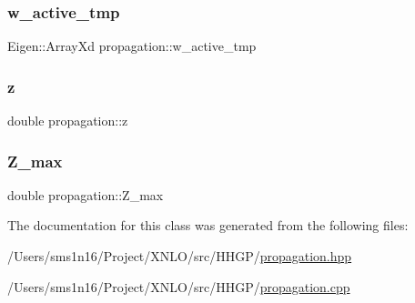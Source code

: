 \subsubsection{\texorpdfstring{w\_active\_tmp}{w\_active\_tmp}}
{\footnotesize\ttfamily Eigen\+::\+Array\+Xd propagation\+::w\+\_\+active\+\_\+tmp\hspace{0.3cm}{\ttfamily [private]}}

\mbox{\label{classpropagation_aeacfc091fafd1fdb1af4536f6f587e55}} 
\subsubsection{\texorpdfstring{z}{z}}
{\footnotesize\ttfamily double propagation\+::z}

\mbox{\label{classpropagation_ae0b2d1a8fa0e59d37e124a0ba1f12dd2}} 
\subsubsection{\texorpdfstring{Z\_max}{Z\_max}}
{\footnotesize\ttfamily double propagation\+::\+Z\+\_\+max\hspace{0.3cm}{\ttfamily [private]}}



The documentation for this class was generated from the following files\+:\begin{DoxyCompactItemize}
\item 
/\+Users/sms1n16/\+Project/\+X\+N\+L\+O/src/\+H\+H\+G\+P/\mbox{\hyperlink{propagation_8hpp}{propagation.\+hpp}}\item 
/\+Users/sms1n16/\+Project/\+X\+N\+L\+O/src/\+H\+H\+G\+P/\mbox{\hyperlink{propagation_8cpp}{propagation.\+cpp}}\end{DoxyCompactItemize}
